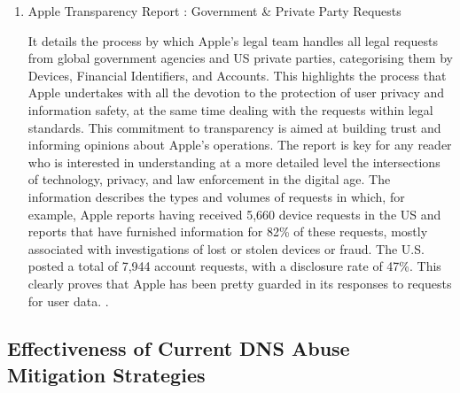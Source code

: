 \begin{enumerate}
 \item Apple Transparency Report : Government \& Private Party Requests 

It details the process by which Apple's legal team handles all legal requests from global government agencies and US private parties, categorising them by Devices, Financial Identifiers, and Accounts. This highlights the process that Apple undertakes with all the devotion to the protection of user privacy and information safety, at the same time dealing with the requests within legal standards. This commitment to transparency is aimed at building trust and informing opinions about Apple's operations. The report is key for any reader who is interested in understanding at a more detailed level the intersections of technology, privacy, and law enforcement in the digital age. The information describes the types and volumes of requests in which, for example, Apple reports having received 5,660 device requests in the US and reports that have furnished information for 82\% of these requests, mostly associated with investigations of lost or stolen devices or fraud. The U.S. posted a total of 7,944 account requests, with a disclosure rate of 47\%. This clearly proves that Apple has been pretty guarded in its responses to requests for user data. \cite{AppleTransparencyReportGB}.


\end{enumerate}

\subsection{Effectiveness of Current DNS Abuse Mitigation Strategies}

